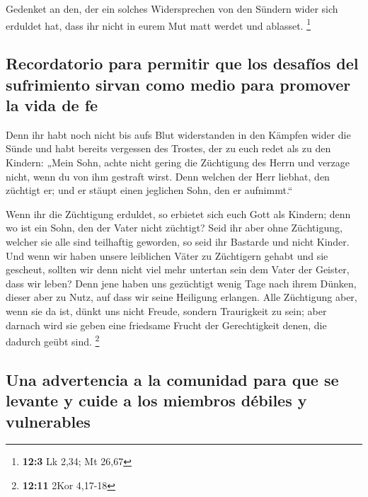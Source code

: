  Gedenket an den, der ein solches Widersprechen von den
Sündern wider sich erduldet hat, dass ihr nicht in eurem Mut matt werdet
und ablasset. \footnote{\textbf{12:3} Lk 2,34; Mt 26,67}

\hypertarget{recordatorio-para-permitir-que-los-desafuxedos-del-sufrimiento-sirvan-como-medio-para-promover-la-vida-de-fe}{%
\subsection{Recordatorio para permitir que los desafíos del sufrimiento
sirvan como medio para promover la vida de
fe}\label{recordatorio-para-permitir-que-los-desafuxedos-del-sufrimiento-sirvan-como-medio-para-promover-la-vida-de-fe}}

 Denn ihr habt noch nicht bis aufs Blut widerstanden in
den Kämpfen wider die Sünde  und habt bereits vergessen
des Trostes, der zu euch redet als zu den Kindern: „Mein Sohn, achte
nicht gering die Züchtigung des Herrn und verzage nicht, wenn du von ihm
gestraft wirst.  Denn welchen der Herr liebhat, den
züchtigt er; und er stäupt einen jeglichen Sohn, den er aufnimmt.``

 Wenn ihr die Züchtigung erduldet, so erbietet sich euch
Gott als Kindern; denn wo ist ein Sohn, den der Vater nicht züchtigt?
 Seid ihr aber ohne Züchtigung, welcher sie alle sind
teilhaftig geworden, so seid ihr Bastarde und nicht Kinder.
 Und wenn wir haben unsere leiblichen Väter zu Züchtigern
gehabt und sie gescheut, sollten wir denn nicht viel mehr untertan sein
dem Vater der Geister, dass wir leben?  Denn jene haben
uns gezüchtigt wenig Tage nach ihrem Dünken, dieser aber zu Nutz, auf
dass wir seine Heiligung erlangen.  Alle Züchtigung aber,
wenn sie da ist, dünkt uns nicht Freude, sondern Traurigkeit zu sein;
aber darnach wird sie geben eine friedsame Frucht der Gerechtigkeit
denen, die dadurch geübt sind. \footnote{\textbf{12:11} 2Kor 4,17-18}

\hypertarget{una-advertencia-a-la-comunidad-para-que-se-levante-y-cuide-a-los-miembros-duxe9biles-y-vulnerables}{%
\subsection{Una advertencia a la comunidad para que se levante y cuide a
los miembros débiles y
vulnerables}\label{una-advertencia-a-la-comunidad-para-que-se-levante-y-cuide-a-los-miembros-duxe9biles-y-vulnerables}}


